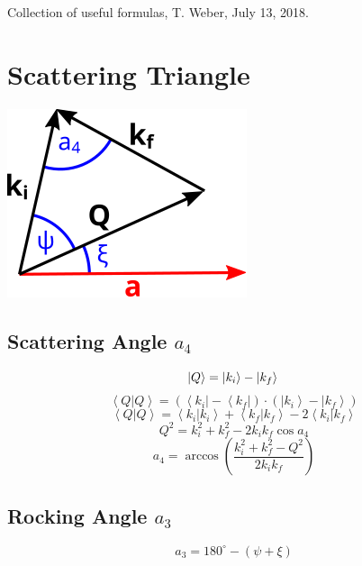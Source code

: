 \documentclass{article}
\begin{document}
Collection of useful formulas, T. Weber, July 13, 2018.


\section{Scattering Triangle}
\begin{center}
	\includegraphics[width = 0.2 \textwidth]{triangle}
\end{center}


\subsection*{Scattering Angle $a_4$}

\begin{equation} \left| Q \right> = \left| k_i \right> - \left| k_f \right> \\ \end{equation}
\begin{equation} \left< Q | Q \right> = \left( \left< k_i \right| - \left< k_f \right| \right) \cdot \left( \left| k_i \right> - \left| k_f \right> \right) \end{equation}
\begin{equation} \left< Q | Q \right> = \left< k_i | k_i \right> + \left< k_f | k_f \right> - 2 \left< k_i | k_f \right> \end{equation}
\begin{equation} Q^2 = k_i^2 + k_f^2 - 2 k_i k_f \cos a_4 \end{equation}
\begin{equation} \boxed{ a_4 = \arccos \left( \frac{k_i^2 + k_f^2 - Q^2}{2 k_i k_f} \right) } \end{equation}



\subsection*{Rocking Angle $a_3$}

\begin{equation} \boxed{ a_3 = 180^{\circ} - \left( \psi + \xi \right) } \end{equation}
\end{document}
